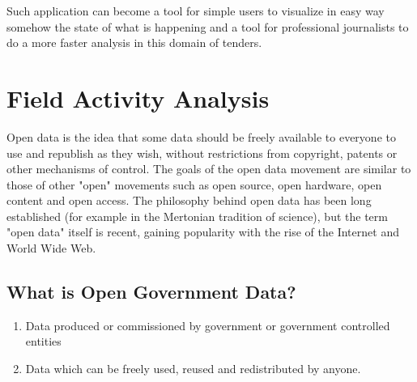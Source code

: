 \documentclass[12pt]{article}
\begin{document}
	
	Such application can become a tool for simple users to visualize in easy way somehow the state of what is happening and a tool for professional journalists to do a more faster analysis in this domain of tenders.

\newpage
\section{Field Activity Analysis}

Open data is the idea that some data should be freely available to everyone to use and republish as they wish, without restrictions from copyright, patents or other mechanisms of control. The goals of the open data movement are similar to those of other "open" movements such as open source, open hardware, open content and open access. The philosophy behind open data has been long established (for example in the Mertonian tradition of science), but the term "open data" itself is recent, gaining popularity with the rise of the Internet and World Wide Web.

\subsection{What is Open Government Data?}
\begin{enumerate}
\item Data produced or commissioned by government or government controlled entities
\item Data which can be freely used, reused and redistributed by anyone.
\end{enumerate}
\end{document}
